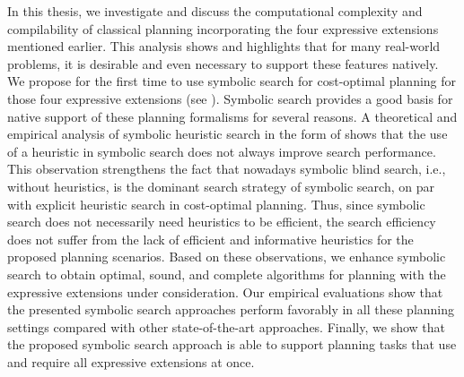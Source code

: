 In this thesis, we investigate and discuss the computational complexity and compilability of classical planning incorporating the four expressive extensions mentioned earlier.
This analysis shows and highlights that for many real-world problems, it is desirable and even necessary to support these features natively.
We propose for the first time to use symbolic search for cost-optimal planning for those four expressive extensions (see ).
Symbolic search provides a good basis for native support of these planning formalisms for several reasons.
A theoretical and empirical analysis of symbolic heuristic search in the form of \bddastar{} shows that the use of a heuristic in symbolic search does not always improve search performance.
This observation strengthens the fact that nowadays symbolic blind search, i.e., without heuristics, is the dominant search strategy of symbolic search, on par with explicit heuristic search in cost-optimal planning.
Thus, since symbolic search does not necessarily need heuristics to be efficient, the search efficiency does not suffer from the lack of efficient and informative heuristics for the proposed planning scenarios.
Based on these observations, we enhance symbolic search to obtain optimal, sound, and complete algorithms for planning with the expressive extensions under consideration.
Our empirical evaluations show that the presented symbolic search approaches perform favorably in all these planning settings compared with other state-of-the-art approaches.
Finally, we show that the proposed symbolic search approach is able to support planning tasks that use and require all expressive extensions at once.

